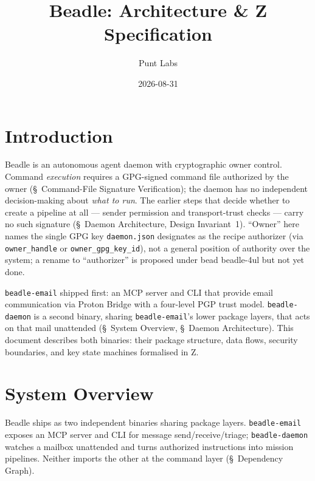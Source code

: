 \documentclass[a4paper,10pt,fleqn]{article}
\begin{document}
\title{Beadle: Architecture \& Z Specification}
\author{Punt Labs}
\date{2026-08-31}
\maketitle

\tableofcontents
\newpage

\section{Introduction}

Beadle is an autonomous agent daemon with cryptographic owner control.
Command \emph{execution} requires a GPG-signed command file authorized
by the owner (\S~Command-File Signature Verification); the daemon has
no independent decision-making about \emph{what to run}. The earlier
steps that decide whether to create a pipeline at all --- sender
permission and transport-trust checks --- carry no such signature (\S~Daemon
Architecture, Design Invariant~1). ``Owner'' here names the single GPG
key \texttt{daemon.json} designates as the recipe authorizer (via
\texttt{owner\_handle} or \texttt{owner\_gpg\_key\_id}), not a general
position of authority over the system; a rename to ``authorizer'' is
proposed under bead beadle-4ul but not yet done.

\texttt{beadle-email} shipped first: an MCP server and CLI that provide
email communication via Proton Bridge with a four-level PGP trust
model. \texttt{beadle-daemon} is a second binary, sharing
\texttt{beadle-email}'s lower package layers, that acts on that mail
unattended (\S~System Overview, \S~Daemon Architecture). This document
describes both binaries: their package structure, data flows, security
boundaries, and key state machines formalised in Z.

\section{System Overview}

Beadle ships as two independent binaries sharing package layers.
\texttt{beadle-email} exposes an MCP server and CLI for message
send/receive/triage; \texttt{beadle-daemon} watches a mailbox
unattended and turns authorized instructions into mission pipelines.
Neither imports the other at the command layer (\S~Dependency Graph).
\end{document}
